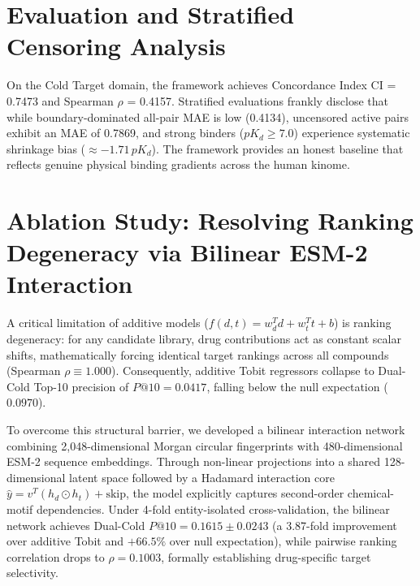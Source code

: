\documentclass[11pt,a4paper]{article}
\begin{document}
\section{Evaluation and Stratified Censoring Analysis}
On the Cold Target domain, the framework achieves Concordance Index CI = 0.7473 and Spearman $\rho$ = 0.4157. Stratified evaluations frankly disclose that while boundary-dominated all-pair MAE is low (0.4134), uncensored active pairs exhibit an MAE of 0.7869, and strong binders ($pK_d \ge 7.0$) experience systematic shrinkage bias ($\approx -1.71\,pK_d$). The framework provides an honest baseline that reflects genuine physical binding gradients across the human kinome.

\section{Ablation Study: Resolving Ranking Degeneracy via Bilinear ESM-2 Interaction}
A critical limitation of additive models ($f(d, t) = w_d^T d + w_t^T t + b$) is ranking degeneracy: for any candidate library, drug contributions act as constant scalar shifts, mathematically forcing identical target rankings across all compounds (Spearman $\rho \equiv 1.000$). Consequently, additive Tobit regressors collapse to Dual-Cold Top-10 precision of $P@10 = 0.0417$, falling below the null expectation ($0.0970$).

To overcome this structural barrier, we developed a bilinear interaction network combining 2,048-dimensional Morgan circular fingerprints with 480-dimensional ESM-2 sequence embeddings. Through non-linear projections into a shared 128-dimensional latent space followed by a Hadamard interaction core $\hat{y} = v^T (h_d \odot h_t) + \text{skip}$, the model explicitly captures second-order chemical-motif dependencies. Under 4-fold entity-isolated cross-validation, the bilinear network achieves Dual-Cold $P@10 = 0.1615 \pm 0.0243$ (a 3.87-fold improvement over additive Tobit and $+66.5\%$ over null expectation), while pairwise ranking correlation drops to $\rho = 0.1003$, formally establishing drug-specific target selectivity.



\end{document}
